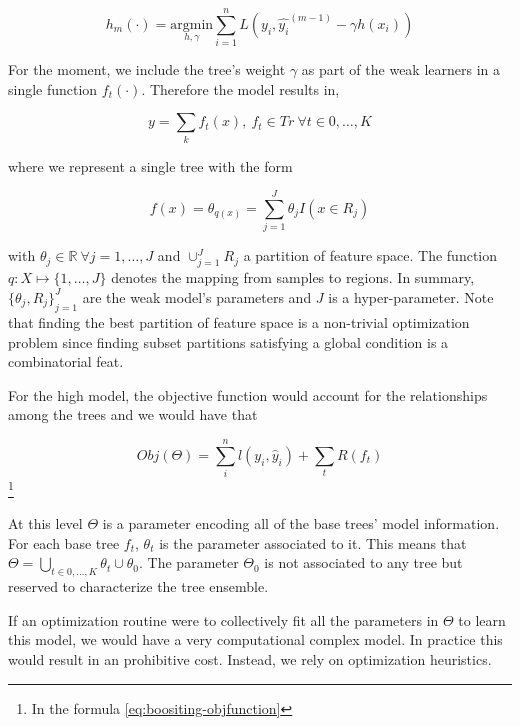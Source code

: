 \begin{equation}
h_m(\cdot) = \underset{h,\gamma}{\mathrm{argmin}}  \sum_{i=1}^{n} L ( y_i, \hat{y_i}^{(m-1)} - \gamma h(x_i) )
\end{equation}


For the moment, we include the tree's weight $\gamma$ as part of the weak learners in a single function $f_t(\cdot)$. 
Therefore the model results in,

\begin{equation}
y = \sum_k f_t(x) , \ f_t \in Tr \ \forall t \in {0,\ldots,K}
\end{equation}

where we represent a single tree with the form

\begin{equation}
f(x) = \theta_{q(x)} = \sum_{j=1}^J \theta_j I(x \in R_j)
\end{equation}

with $\theta_j \in \mathbb{R} \ \forall j = 1,\ldots,J$ and $ \cup_{j=1}^J R_j$ a partition of feature space. 
The function $q : X \mapsto \{1,\ldots,J\}$ denotes the mapping from samples to regions. 
In summary, ${\{\theta_j, R_j\}}_{j=1}^J$ are the weak model's parameters and $J$ is a hyper-parameter. 
Note that finding the best partition of feature space is a non-trivial optimization problem since finding subset partitions satisfying a global condition is a combinatorial feat.

For the high model, the objective function would account for the relationships among the trees and we would have that

\begin{equation}
Obj(\Theta) = \sum_i^n l(y_i,\hat{y}_i) + \sum_t R(f_t)
\end{equation}\label{eq:boositing-objfunction}\footnote{In the formula \cref{eq:boositing-objfunction} }

At this level $\Theta$ is a parameter encoding all of the base trees' model information. 
For each base tree $f_t$, $\theta_t$ is the parameter associated to it. 
This means that $\Theta = \bigcup_{t \in {0,\ldots,K}} \theta_t \cup \theta_0$. 
The parameter $\Theta_0$ is not associated to any tree but reserved to characterize the tree ensemble.

If an optimization routine were to collectively fit all the parameters in $\Theta$ to learn this model, we would have a very computational complex model. 
In practice this would result in an prohibitive cost. 
Instead, we rely on optimization heuristics.

